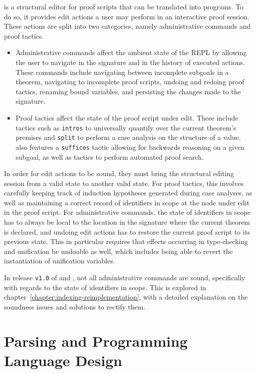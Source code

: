 \Harpoon is a structural editor for proof scripts that can be translated into \Beluga programs.
To do so, it provides edit actions a user may perform in an interactive proof session.
These actions are split into two categories, namely administrative commands and proof tactics.
\begin{itemize}
\item
Administrative commands affect the ambient state of the \ac{REPL} by allowing the user to navigate in the \Beluga signature and in the history of executed actions.
These commands include navigating between incomplete subgoals in a theorem, navigating to incomplete proof scripts, undoing and redoing proof tactics, renaming bound variables, and persisting the changes made to the signature.
\item
Proof tactics affect the state of the proof script under edit.
These include tactics such as \verb|intros| to universally quantify over the current theorem's premises and \verb|split| to perform a case analysis on the structure of a value.
\Harpoon also features a \verb|suffices| tactic allowing for backwards reasoning on a given subgoal, as well as tactics to perform automated proof search.
\end{itemize}

In order for \Harpoon edit actions to be sound, they must bring the structural editing session from a valid state to another valid state.
For proof tactics, this involves carefully keeping track of induction hypotheses generated during case analyses, as well as maintaining a correct record of identifiers in scope at the node under edit in the proof script.
For administrative commands, the state of identifiers in scope has to always be local to the location in the \Beluga signature where the current theorem is declared, and undoing edit actions has to restore the current proof script to its previous state.
This in particular requires that effects occurring in type-checking and unification be undoable as well, which includes being able to revert the instantiation of unification variables.

In release \texttt{v1.0} of \Beluga and \Harpoon, not all administrative commands are sound, specifically with regards to the state of identifiers in scope.
This is explored in chapter~\ref{chapter:indexing-reimplementation}, with a detailed explanation on the soundness issues and solutions to rectify them.

\section{Parsing and Programming Language Design}\label{section:background-parsing}

